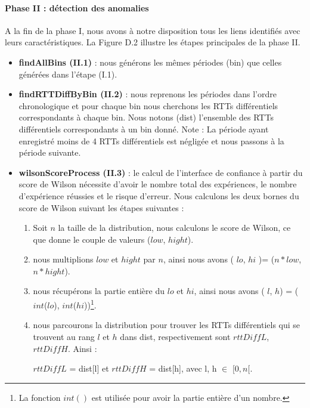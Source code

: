 \paragraph{ Phase II : détection des anomalies}

 A la fin de la phase I, nous avons à notre disposition tous les liens identifiés avec leurs
 caractéristiques. La Figure D.2 illustre les étapes principales de la phase II.
 
 \begin{itemize}

 \item \textbf{ findAllBins (II.1)} : nous générons les mêmes périodes  {\color{gray}(bin)} que celles générées dans
 l'étape (I.1).
 \item \textbf{ findRTTDiffByBin (II.2)} : nous reprenons les périodes dans l'ordre chronologique et
 pour chaque bin nous cherchons les RTTs différentiels correspondants à chaque  {\color{gray}bin}. Nous
 notons  {\color{gray}(dist)} l'ensemble des RTTs différentiels correspondants à un bin donné.
 Note : La période ayant enregistré moins de 4 RTTs différentiels est négligée et nous
 passons à la période suivante.
\item \textbf{ wilsonScoreProcess (II.3)} : le calcul de l'interface de confiance à partir du score de Wilson nécessite d'avoir le nombre total des expériences, le nombre d'expérience réussies et  le risque d'erreur. Nous calculons les deux bornes du score de Wilson suivant les étapes suivantes :

\begin{enumerate}
	\item Soit $n$ la taille de la distribution, nous calculons le score de Wilson, ce que donne le couple de valeurs ($ low $, $ hight $).
	\item nous multiplions $ low $ et $ hight $ par  $n$, ainsi nous avons ( $ lo $, $ hi $ )=  ($ n*low $, $ n*hight $).
	\item nous récupérons la partie entière du  $ lo $ et $ hi $, ainsi nous avons ( $l$, $h$) = ($ int $($ lo $), $ int $($ hi $))\footnote{La fonction $  int() $ est utilisée pour avoir la partie entière d'un nombre.}.
	\item  nous parcourons la distribution {\color{gray}{dist}} pour trouver les RTTs différentiels qui se trouvent au rang $  l $ et $ h $ dans {\color{gray}dist}, respectivement sont $ rttDiffL $, $ rttDiffH $. Ainsi :
	
	 $ rttDiffL $ = dist[l]  et $ rttDiffH$ = dist[h], avec l, h $\in$ $[0,n[$. 
	

\end{enumerate}
\end{itemize}
